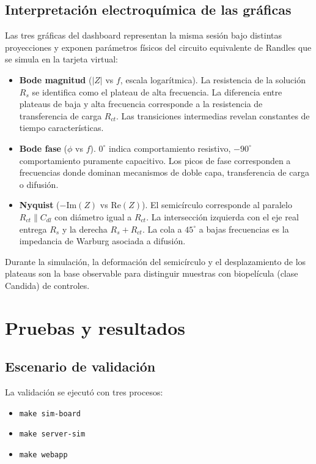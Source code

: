 \documentclass[11pt,a4paper,spanish]{book}
\begin{document}
\section{Interpretaci\'{o}n electroqu\'{i}mica de las gr\'{a}ficas}

Las tres gr\'{a}ficas del dashboard representan la misma sesi\'{o}n bajo distintas proyecciones y exponen par\'{a}metros f\'{i}sicos del circuito equivalente de Randles que se simula en la tarjeta virtual:

\begin{itemize}
	\item \textbf{Bode magnitud} ($|Z|$ vs $f$, escala logar\'{i}tmica). La resistencia de la soluci\'{o}n $R_s$ se identifica como el plateau de alta frecuencia. La diferencia entre plateaus de baja y alta frecuencia corresponde a la resistencia de transferencia de carga $R_{ct}$. Las transiciones intermedias revelan constantes de tiempo caracter\'{i}sticas.
	\item \textbf{Bode fase} ($\phi$ vs $f$). $0^\circ$ indica comportamiento resistivo, $-90^\circ$ comportamiento puramente capacitivo. Los picos de fase corresponden a frecuencias donde dominan mecanismos de doble capa, transferencia de carga o difusi\'{o}n.
	\item \textbf{Nyquist} ($-\mathrm{Im}(Z)$ vs $\mathrm{Re}(Z)$). El semic\'{i}rculo corresponde al paralelo $R_{ct} \parallel C_{dl}$ con di\'{a}metro igual a $R_{ct}$. La intersecci\'{o}n izquierda con el eje real entrega $R_s$ y la derecha $R_s + R_{ct}$. La cola a $45^\circ$ a bajas frecuencias es la impedancia de Warburg asociada a difusi\'{o}n.
\end{itemize}

Durante la simulaci\'{o}n, la deformaci\'{o}n del semic\'{i}rculo y el desplazamiento de los plateaus son la base observable para distinguir muestras con biopel\'{i}cula (clase Candida) de controles.


\chapter{Pruebas y resultados}

\section{Escenario de validaci\'{o}n}

La validaci\'{o}n se ejecut\'{o} con tres procesos:
\begin{itemize}
	\item \texttt{make sim-board}
	\item \texttt{make server-sim}
	\item \texttt{make webapp}
\end{itemize}
\end{document}
